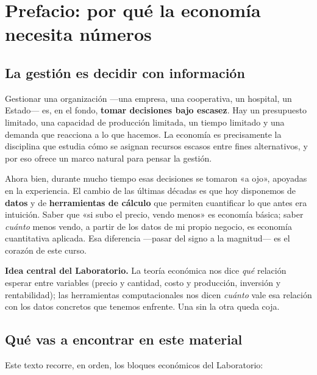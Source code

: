 \chapter{Prefacio: por qué la economía necesita números}
\label{cap:prefacio}

\section{La gestión es decidir con información}

Gestionar una organización —una empresa, una cooperativa, un hospital, un Estado— es, en el fondo, \textbf{tomar decisiones bajo escasez}. Hay un presupuesto limitado, una capacidad de producción limitada, un tiempo limitado y una demanda que reacciona a lo que hacemos. La economía es precisamente la disciplina que estudia cómo se asignan recursos escasos entre fines alternativos, y por eso ofrece un marco natural para pensar la gestión.

Ahora bien, durante mucho tiempo esas decisiones se tomaron «a ojo», apoyadas en la experiencia. El cambio de las últimas décadas es que hoy disponemos de \textbf{datos} y de \textbf{herramientas de cálculo} que permiten cuantificar lo que antes era intuición. Saber que «si subo el precio, vendo menos» es economía básica; saber \emph{cuánto} menos vendo, a partir de los datos de mi propio negocio, es economía cuantitativa aplicada. Esa diferencia —pasar del signo a la magnitud— es el corazón de este curso.

\begin{ideabox}
\textbf{Idea central del Laboratorio.} La teoría económica nos dice \emph{qué} relación esperar entre variables (precio y cantidad, costo y producción, inversión y rentabilidad); las herramientas computacionales nos dicen \emph{cuánto} vale esa relación con los datos concretos que tenemos enfrente. Una sin la otra queda coja.
\end{ideabox}

\section{Qué vas a encontrar en este material}

Este texto recorre, en orden, los bloques económicos del Laboratorio:

